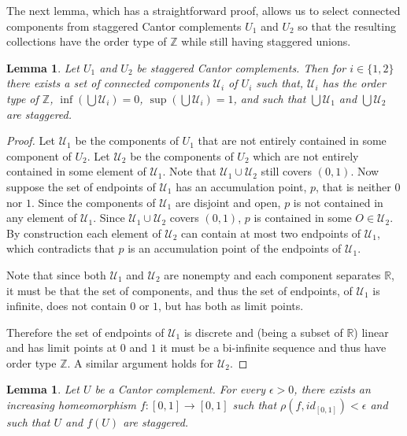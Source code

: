 \documentclass[12pt, leqno]{amsart}
\newcommand{\ui}{[0,1]}
\newcommand{\scru}{\mathscr{U}}
\newcommand{\bbr}{\mathbb{R}}
\newcommand{\bbz}{\mathbb{Z}}
\newtheorem{lemma}[theorem]{Lemma}
\theoremstyle{definition}\newtheorem{definition}[theorem]{Definition}
\begin{document}
The next lemma, which has a straightforward proof, allows us to select connected components from staggered Cantor complements $U_1$ and $U_2$ so that the resulting collections have the order type of $\bbz$ while still having staggered unions.


\begin{lemma}\label{choosezsetlemma}
Let $U_1$ and $U_2$ be staggered Cantor complements. Then for $i\in\{1,2\}$ there exists a set of connected components $\scru_i$ of $U_i$ such that, $\scru_i$ has the order type of $\bbz$, $\inf(\bigcup\scru_i)=0$, $\sup(\bigcup\scru_i)=1$, and such that $\bigcup\scru_1$ and $\bigcup\scru_2$ are staggered.
\end{lemma}

\begin{proof}
    Let $\scru_1$ be the components of $U_1$ that are not entirely contained in some component of $U_2$.  Let $\scru_2$ be the components of $U_2$ which are not entirely contained in some element of $\scru_1$.  Note that $\scru_1\cup\scru_2$ still covers $(0,1)$. Now suppose the set of endpoints of $\scru_1$ has an accumulation point, $p$,  that is neither $0$ nor $1$. Since the components of $\scru_1$ are disjoint and open, $p$ is not contained in any element of $\scru_1$. Since  $\scru_1\cup\scru_2$ covers  $(0,1)$, $p$ is contained in some  $O\in\scru_2$. By construction each element of $\scru_2$ can contain at most two endpoints of $\scru_1$, which contradicts that $p$ is an accumulation point of the endpoints of $\scru_1$.

    Note that since both $\scru_1$ and $\scru_2$ are nonempty and each component  separates $\bbr$, it must be that the set of components, and thus the set of endpoints, of $\scru_1$ is infinite, does not contain $0$ or $1$, but has both as limit points.

    Therefore the set of endpoints of $\scru_1$ is discrete and (being a subset of $\bbr$) linear and has limit points at $0$ and $1$ it must be a bi-infinite sequence and thus have order type $\bbz$.  A similar argument holds for $\scru_2$.
\end{proof}

\begin{lemma}\label{lemmaccsetmove}
Let $U$ be a Cantor complement. For every $\epsilon>0$, there exists an increasing homeomorphism $f:\ui\to \ui$ such that $\rho(f,id_{\ui})<\epsilon$ and such that $U$ and $f(U)$ are staggered.
\end{lemma}
\end{document}
